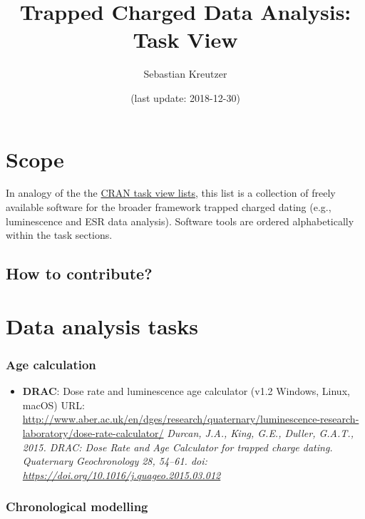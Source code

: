 \documentclass[]{article}
\title{Trapped Charged Data Analysis: Task View}
\author{Sebastian Kreutzer}
\date{(last update: 2018-12-30)}
\providecommand{\tightlist}{%
  \setlength{\itemsep}{0pt}\setlength{\parskip}{0pt}}
\begin{document}
\maketitle

\hypertarget{scope}{%
\section{Scope}\label{scope}}

In analogy of the the \href{https://cran.rstudio.com/web/views/}{CRAN task view lists},
this list is a collection of freely available software for the broader framework
trapped charged dating (e.g., luminescence and ESR data analysis). Software tools are
ordered alphabetically within the task sections.

\hypertarget{how-to-contribute}{%
\subsection{How to contribute?}\label{how-to-contribute}}

\hypertarget{data-analysis-tasks}{%
\section{Data analysis tasks}\label{data-analysis-tasks}}

\hypertarget{age-calculation}{%
\subsubsection{Age calculation}\label{age-calculation}}

\begin{itemize}
\tightlist
\item
  \textbf{DRAC}: Dose rate and luminescence age calculator
  (v1.2 \textbar{} Windows, Linux, macOS)
  URL: \url{http://www.aber.ac.uk/en/dges/research/quaternary/luminescence-research-laboratory/dose-rate-calculator/}
  \emph{Durcan, J.A., King, G.E., Duller, G.A.T., 2015. DRAC: Dose Rate and Age Calculator for trapped charge dating. Quaternary Geochronology 28, 54--61. doi: \url{https://doi.org/10.1016/j.quageo.2015.03.012}}
\end{itemize}

\hypertarget{chronological-modelling}{%
\subsubsection{Chronological modelling}\label{chronological-modelling}}
\end{document}
